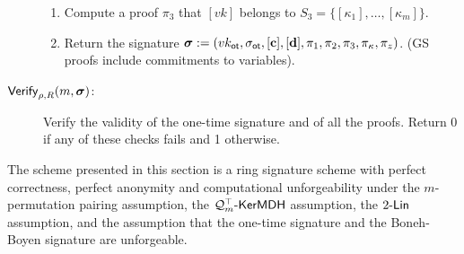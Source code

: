 \begin{description}
\begin{enumerate}
\item Compute a proof $\pi_3$ that $[vk]$ belongs to $S_3=\{[\kappa_1],\ldots,[\kappa_m]\}$.
\item Return the signature ${\boldsymbol \sigma}:=(vk_\mathsf{ot},\sigma_\mathsf{ot},[\mathbf{c}],[\mathbf{d}],\pi_1,\pi_2,\pi_3,\pi_\kappa,\pi_z)$. (GS proofs include commitments to variables).
\end{enumerate}
\item[$\mathsf{Verify}_{\rho,R}(m,{\boldsymbol \sigma})$:] Verify the validity of the one-time signature and of all the proofs. Return 0 if any of these checks fails and 1 otherwise.
\end{description}

\begin{theorem}
The scheme presented in this section is a ring signature scheme
with perfect correctness, perfect anonymity and computational unforgeability under the
$m$-permutation pairing assumption, the $\mathcal{Q}_m^\top\mbox{-}\mathsf{KerMDH}$ assumption, the $2\mbox{-}\mathsf{Lin}$ assumption, and the assumption
that the one-time signature and the Boneh-Boyen signature are unforgeable.
\end{theorem}
